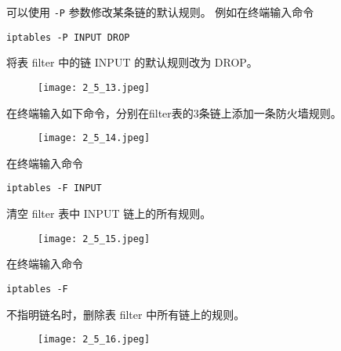 可以使用 \texttt{-P} 参数修改某条链的默认规则。
例如在终端输入命令
\begin{verbatim}
iptables -P INPUT DROP
\end{verbatim}
将表 filter 中的链 INPUT 的默认规则改为 DROP。
\begin{figure}[H]
  \begin{center}
    \texttt{[image: 2\_5\_13.jpeg]}
  \end{center}
\end{figure}

在终端输入如下命令，分别在filter表的3条链上添加一条防火墙规则。
\begin{figure}[H]
  \begin{center}
    \texttt{[image: 2\_5\_14.jpeg]}
  \end{center}
\end{figure}

在终端输入命令
\begin{verbatim}
iptables -F INPUT
\end{verbatim}
清空 filter 表中 INPUT 链上的所有规则。
\begin{figure}[H]
  \begin{center}
    \texttt{[image: 2\_5\_15.jpeg]}
  \end{center}
\end{figure}

在终端输入命令
\begin{verbatim}
iptables -F
\end{verbatim}
不指明链名时，删除表 filter 中所有链上的规则。
\begin{figure}[H]
  \begin{center}
    \texttt{[image: 2\_5\_16.jpeg]}
  \end{center}
\end{figure}
